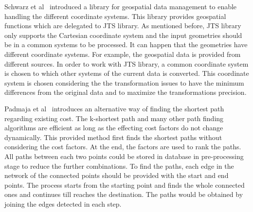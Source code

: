 \documentclass[a4paper,12pt]{article}
\begin{document}
Schwarz et al~\cite{Schwarz2004} introduced a library for geospatial data management to enable handling the different coordinate systems. This library provides geospatial functions which are delegated to JTS library. As mentioned before, JTS library only supports the Cartesian coordinate system and the input geometries should be in a common systems to be processed. It can happen that the geometries have different coordinate systems. For example, the geospatial data is provided from different sources. In order to work with JTS library, a common coordinate system is chosen to which other systems of the current data is converted. This coordinate system is chosen considering the the transformation issues to have the minimum differences from the original data and to maximize the transformations precision.


Padmaja et al~\cite{short-path} introduces an alternative way of finding the shortest path regarding existing cost. The k-shortest path and many other path finding algorithms are efficient as long as the effecting cost factors do not change dynamically. This provided method first finds the shortest paths without considering the cost factors. At the end, the factors are used to rank the paths. All paths between each two points could be stored in database in pre-processing stage to reduce the further combinations. To find the paths, each edge in the network of the connected points should be provided with the start and end points. The process starts from the starting point and finds the whole connected ones and continues till reaches the destination. The paths would be obtained by joining the edges detected in each step.
















\newpage
\end{document}
